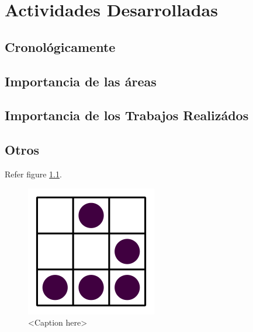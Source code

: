 \chapter{Actividades Desarrolladas}

\section{Cronológicamente}
\section{Importancia de las áreas}
\section{Importancia de los Trabajos Realizádos}
\section{Otros}
Refer figure \ref{fig:label}.

\begin{figure}[htb]
  \centering
  \includegraphics[scale=0.3]{images/test-image.png}
  \caption{<Caption here>}
  \label{fig:label}
\end{figure}
